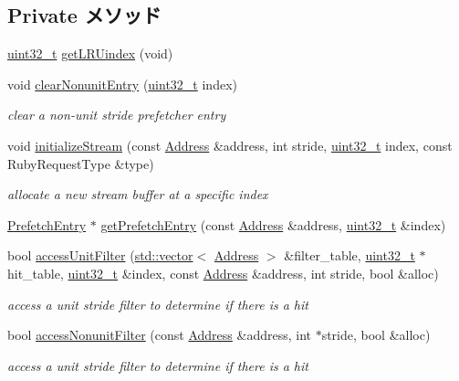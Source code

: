 \subsection*{Private メソッド}
\begin{DoxyCompactItemize}
\item 
\hyperlink{Type_8hh_a435d1572bf3f880d55459d9805097f62}{uint32\_\-t} \hyperlink{classPrefetcher_ae2a3897ee6d47f9e162f17bea5f21a11}{getLRUindex} (void)
\item 
void \hyperlink{classPrefetcher_a6bd67ad0a5fd462f191abb16d3c6bfa8}{clearNonunitEntry} (\hyperlink{Type_8hh_a435d1572bf3f880d55459d9805097f62}{uint32\_\-t} index)
\begin{DoxyCompactList}\small\item\em clear a non-\/unit stride prefetcher entry \item\end{DoxyCompactList}\item 
void \hyperlink{classPrefetcher_a5125f46f95961714c0ebdf658b6bb745}{initializeStream} (const \hyperlink{classAddress}{Address} \&address, int stride, \hyperlink{Type_8hh_a435d1572bf3f880d55459d9805097f62}{uint32\_\-t} index, const RubyRequestType \&type)
\begin{DoxyCompactList}\small\item\em allocate a new stream buffer at a specific index \item\end{DoxyCompactList}\item 
\hyperlink{classPrefetchEntry}{PrefetchEntry} $\ast$ \hyperlink{classPrefetcher_a9d6cbff2a87bd34af85710cae48c6077}{getPrefetchEntry} (const \hyperlink{classAddress}{Address} \&address, \hyperlink{Type_8hh_a435d1572bf3f880d55459d9805097f62}{uint32\_\-t} \&index)
\item 
bool \hyperlink{classPrefetcher_ab7279136d42cc2cc34787356c5dc6f67}{accessUnitFilter} (\hyperlink{classstd_1_1vector}{std::vector}$<$ \hyperlink{classAddress}{Address} $>$ \&filter\_\-table, \hyperlink{Type_8hh_a435d1572bf3f880d55459d9805097f62}{uint32\_\-t} $\ast$hit\_\-table, \hyperlink{Type_8hh_a435d1572bf3f880d55459d9805097f62}{uint32\_\-t} \&index, const \hyperlink{classAddress}{Address} \&address, int stride, bool \&alloc)
\begin{DoxyCompactList}\small\item\em access a unit stride filter to determine if there is a hit \item\end{DoxyCompactList}\item 
bool \hyperlink{classPrefetcher_a11579c7a5838c568fb11ac662a82d6f5}{accessNonunitFilter} (const \hyperlink{classAddress}{Address} \&address, int $\ast$stride, bool \&alloc)
\begin{DoxyCompactList}\small\item\em access a unit stride filter to determine if there is a hit \item\end{DoxyCompactList}\end{DoxyCompactItemize}
